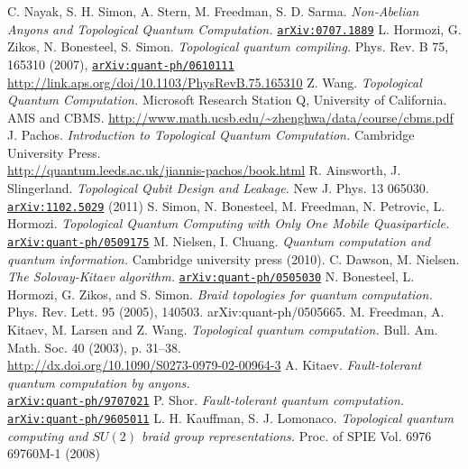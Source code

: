 \begin{thebibliography}{99}
   C. Nayak, S. H. Simon, A. Stern, M. Freedman, S. D. Sarma. \textit{Non-Abelian Anyons and Topological Quantum Computation.} \href{https://arxiv.org/pdf/0707.1889.pdf}{\texttt{arXiv:0707.1889}}
   L. Hormozi, G. Zikos, N. Bonesteel, S. Simon. \textit{Topological quantum compiling.} Phys. Rev. B 75, 165310 (2007), \href{https://arxiv.org/abs/quant-ph/0610111}{\texttt{arXiv:quant-ph/0610111}} \\ \url{http://link.aps.org/doi/10.1103/PhysRevB.75.165310}
   Z. Wang. \textit{Topological Quantum Computation.} Microsoft Research Station Q, University of California. AMS and CBMS. \url{http://www.math.ucsb.edu/~zhenghwa/data/course/cbms.pdf}
   J. Pachos. \textit{Introduction to Topological Quantum Computation.} Cambridge University Press. \\ \url{http://quantum.leeds.ac.uk/jiannis-pachos/book.html}%
   R. Ainsworth, J. Slingerland. \textit{Topological Qubit Design and Leakage.} New J. Phys. 13 065030. \href{https://arxiv.org/abs/1102.5029}{\texttt{arXiv:1102.5029}} (2011)
   S. Simon, N. Bonesteel, M. Freedman, N. Petrovic, L. Hormozi. \textit{Topological Quantum Computing with Only One Mobile Quasiparticle.} \href{https://arxiv.org/abs/quant-ph/0509175}{\texttt{arXiv:quant-ph/0509175}}
   M. Nielsen, I. Chuang. \textit{Quantum computation and quantum information.} Cambridge university press (2010).
   C. Dawson, M. Nielsen. \textit{The Solovay-Kitaev algorithm.} \href{https://arxiv.org/abs/quant-ph/0505030}{\texttt{arXiv:quant-ph/0505030}}
   N. Bonesteel, L. Hormozi, G. Zikos, and S. Simon. \textit{Braid topologies for quantum computation.} Phys. Rev. Lett. 95 (2005), 140503. arXiv:quant-ph/0505665.
   M. Freedman, A. Kitaev, M. Larsen and Z. Wang. \textit{Topological quantum computation.} Bull. Am. Math. Soc. 40 (2003), p. 31–38. \\ \url{http://dx.doi.org/10.1090/S0273-0979-02-00964-3}
   A. Kitaev. \textit{Fault-tolerant quantum computation by anyons.} \\ \href{https://arxiv.org/abs/quant-ph/9707021}{\texttt{arXiv:quant-ph/9707021}}
   P. Shor. \textit{Fault-tolerant quantum computation.} \href{https://arxiv.org/abs/quant-ph/9605011}{\texttt{arXiv:quant-ph/9605011}}
   L. H. Kauffman, S. J. Lomonaco. \textit{Topological quantum computing and $SU(2)$ braid group representations.} Proc. of SPIE Vol. 6976  69760M-1 (2008)


\end{thebibliography}

